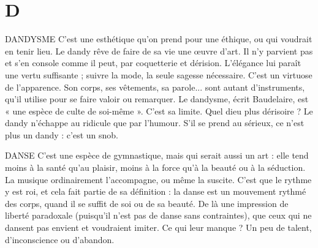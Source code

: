 
\chapter{D}

DANDYSME C’est une esthétique qu’on prend pour une éthique, ou qui
voudrait en tenir lieu. Le dandy rêve de faire de sa vie une
œuvre d'art. Il n’y parvient pas et s’en console comme il peut, par coquetterie
et dérision. L’élégance lui paraît une vertu suffisante ; suivre la mode, la seule
sagesse nécessaire. C’est un virtuose de l’apparence. Son corps, ses vêtements, sa
parole... sont autant d’instruments, qu’il utilise pour se faire valoir ou remarquer.
Le dandysme, écrit Baudelaire, est « une espèce de culte de soi-même ».
C’est sa limite. Quel dieu plus dérisoire ? Le dandy n’échappe au ridicule que
par l'humour. S’il se prend au sérieux, ce n’est plus un dandy : c’est un snob.

DANSE C’est une espèce de gymnastique, mais qui serait aussi un art : elle
tend moins à la santé qu’au plaisir, moins à la force qu’à la beauté
ou à la séduction. La musique ordinairement l’accompagne, ou même la suscite.
C’est que le rythme y est roi, et cela fait partie de sa définition : la danse
est un mouvement rythmé des corps, quand il se suffit de soi ou de sa beauté.
De là une impression de liberté paradoxale (puisqu'il n’est pas de danse sans
contraintes), que ceux qui ne dansent pas envient et voudraient imiter. Ce qui
leur manque ? Un peu de talent, d’inconscience ou d’abandon.

